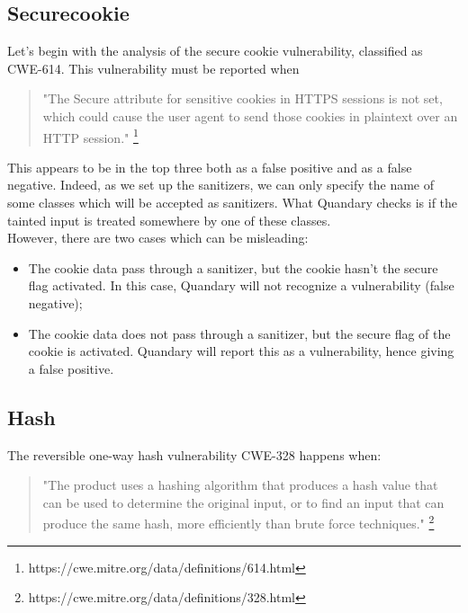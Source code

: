 \documentclass[../Report.tex]{subfiles}
\begin{document}
\subsection{Securecookie}
Let's begin with the analysis of the secure cookie vulnerability, classified as CWE-614. This vulnerability must be reported when 

	\begin{quote}"The Secure attribute for sensitive cookies in HTTPS sessions is not set, which could cause the user agent to send those cookies in plaintext over an HTTP session." \footnote{https://cwe.mitre.org/data/definitions/614.html}\end{quote}
	
This appears to be in the top three both as a false positive and as a false negative. Indeed, as we set up the sanitizers, we can only specify the name of some classes which will be accepted as sanitizers. What Quandary checks is if the tainted input is treated somewhere by one of these classes. \\
However, there are two cases which can be misleading:
\begin{itemize}
	\item The cookie data pass through a sanitizer, but the cookie hasn't the secure flag activated. In this 
	case, Quandary will not recognize a vulnerability (false negative);
	\item The cookie data does not pass through a sanitizer, but the secure flag of the cookie is activated.
	Quandary will report this as a vulnerability, hence giving a false positive.
\end{itemize}

\subsection{Hash}

The reversible one-way hash vulnerability CWE-328 happens when: 

	\begin{quote}
		"The product uses a hashing algorithm that produces a hash value that can be used to determine the original input, or to find an input that can produce the same hash, more efficiently than brute force techniques."
		\footnote{https://cwe.mitre.org/data/definitions/328.html}
	\end{quote}
\end{document}
